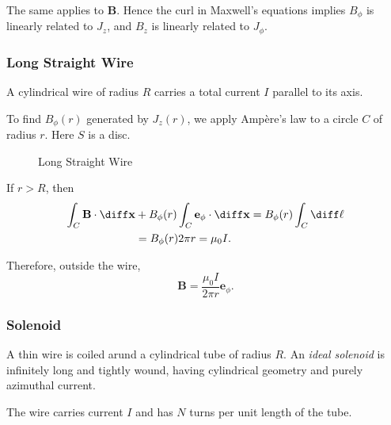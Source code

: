 \documentclass[12pt]{article}
\begin{document}
The same applies to $\mathbf{B}$. Hence the curl in Maxwell's equations implies $B_{\phi}$ is linearly related to $J_z$, and $B_z$ is linearly related to $J_{\phi}$.

\subsubsection{Long Straight Wire}
\label{subsub:long_straight_wire}

A cylindrical wire of radius $R$ carries a total current $I$ parallel to its axis.

To find $B_{\phi}(r)$ generated by $J_z(r)$, we apply Amp\`{e}re's law to a circle $C$ of radius $r$. Here $S$ is a disc.

\begin{figure}[h]
	\centering
	\caption{Long Straight Wire}
	\label{fig:long_straight_wire}
\end{figure}

If $r > R$, then
\begin{align*}
	\int_{C} \mathbf{B} \cdot \diff \mathbf{x} &+ B_{\phi}(r) \int_{C} \mathbf{e}_{\phi} \cdot \diff \mathbf{x} = B_{\phi}(r) \int_{C} \diff \ell \\
						   &= B_{\phi}(r) 2 \pi r = \mu_0 I.
\end{align*}

Therefore, outside the wire,
\[
\mathbf{B} = \frac{\mu_0 I}{2 \pi r} \mathbf{e}_{\phi}
.\]

\subsubsection{Solenoid}
\label{subsub:solenoid}

A thin wire is coiled arund a cylindrical tube of radius $R$. An \emph{ideal solenoid} is infinitely long and tightly wound, having cylindrical geometry and purely azimuthal current.

The wire carries current $I$ and has $N$ turns per unit length of the tube.
\end{document}
